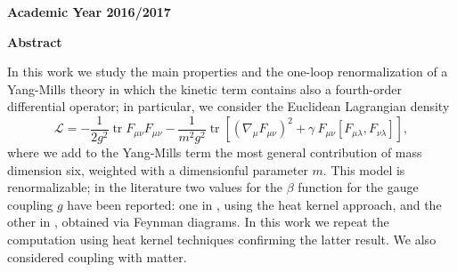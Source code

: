 \documentclass[10pt,a4paper,openany]{book}
\DeclareMathOperator{\tr}{tr}
\newcommand{\Lagr}{ { \mathcal{L} } }
\newcommand{\covD}{ { \mathcal{\nabla} } }
\newcommand{\1}{ { \mathbbm{1} } }
\numberwithin{equation}{section} %
\begin{document}
	
	\begin{center}
	\bfseries 
	\large
	Academic Year 2016/2017
	
	\end{center}



	\newpage
	\pagestyle{empty}








	\fancyhead{} %
	\fancyhead[LE]{\scshape \leftmark}
	\fancyhead[RO]{\scshape \rightmark}
	\fancyfoot[LE,RO]{\thepage}
	\fancyfoot[LO,CE]{ }
	\fancyfoot[CO,RE]{ }
	\renewcommand{\headrulewidth}{0.4pt}
	\renewcommand{\footrulewidth}{0.4pt}



	\begin{center}
		\Large
		\textbf{Abstract}
	\end{center}
	
In this work we  study the main properties and the one-loop renormalization of a Yang-Mills theory in which the kinetic term contains also a fourth-order differential operator; in particular, we consider the Euclidean Lagrangian density
\begin{equation*}
\Lagr
	=
- \frac{1}{2 g^2} \tr  F_{\mu\nu} F_{\mu\nu} %
	- \frac{1}{ m^2 g^2 }\tr
		\left[
			 \left( \covD_\mu F_{\mu\nu} \right)^2
			+ \gamma   \: F_{\mu\nu}
				\left[ F_{\mu\lambda},
				F_{\nu\lambda} \right] 
			\right],
\end{equation*}
where
we add to the Yang-Mills term the most general contribution of mass dimension six, weighted with a dimensionful parameter $m$. 
This model is renormalizable; in the literature two values for the $\beta$ function for the gauge coupling $g$ have been reported: one in \cite{Fradkin:1981iu}, using the heat kernel approach, and the other in  \cite{Grinstein:2008qq,Schuster}, obtained via Feynman diagrams.
In this work we repeat the computation using heat kernel techniques confirming the latter result. We also considered coupling with matter.
\end{document}

